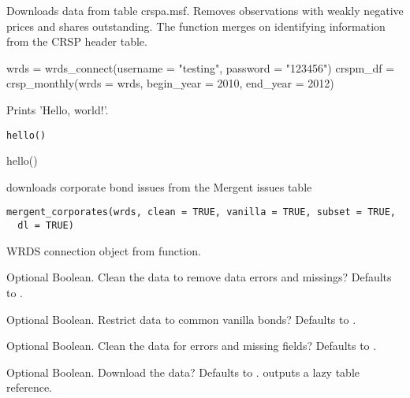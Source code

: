 \documentclass[a4paper]{book}
\begin{document}
%
\begin{Details}\relax
Downloads data from table crspa.msf. Removes observations with weakly negative prices and
shares outstanding. The function merges on identifying information from the
CRSP header table.
\end{Details}
%
\begin{Examples}
\begin{ExampleCode}
wrds = wrds_connect(username = "testing", password = "123456")
crspm_df = crsp_monthly(wrds = wrds, begin_year = 2010, end_year = 2012)
\end{ExampleCode}
\end{Examples}
%
\begin{Description}\relax
Prints 'Hello, world!'.
\end{Description}
%
\begin{Usage}
\begin{verbatim}
hello()
\end{verbatim}
\end{Usage}
%
\begin{Examples}
\begin{ExampleCode}
hello()
\end{ExampleCode}
\end{Examples}
%
\begin{Description}\relax
{} downloads corporate bond issues from the Mergent issues table
\end{Description}
%
\begin{Usage}
\begin{verbatim}
mergent_corporates(wrds, clean = TRUE, vanilla = TRUE, subset = TRUE,
  dl = TRUE)
\end{verbatim}
\end{Usage}
%
\begin{Arguments}
\begin{ldescription}
\item[\code{wrds}] WRDS connection object from  function.

\item[\code{clean}] Optional Boolean. Clean the data to remove data errors and missings? Defaults to
.

\item[\code{vanilla}] Optional Boolean. Restrict data to common vanilla bonds? Defaults to .

\item[\code{subset}] Optional Boolean. Clean the data for errors and missing fields? Defaults to
.

\item[\code{dl}] Optional Boolean. Download the data? Defaults to .  outputs a
lazy  table reference.
\end{ldescription}
\end{Arguments}
\end{document}
